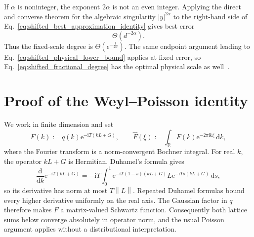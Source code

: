 \documentclass[aps,pra,reprint,floatfix,unsortedaddress,superscriptaddress]{revtex4-2}
\newcommand{\norm}[1]{\left\lVert#1\right\rVert}
\newcommand{\abs}[1]{\left\lvert#1\right\rvert}
\begin{document}
If $\alpha$ is noninteger, the exponent $2\alpha$ is not an even
integer.  Applying the direct and converse theorem for the algebraic
singularity $\abs{y}^{2\alpha}$ to the right-hand side of
Eq.~\eqref{eq:shifted_best_approximation_identity} gives best error
\begin{equation}
    \Theta(d^{-2\alpha}).
    \label{eq:shifted_fractional_best_error}
\end{equation}
Thus the fixed-scale degree is
$\Theta(\epsilon^{-\frac{1}{2\alpha}})$.  The same endpoint
argument leading to Eq.~\eqref{eq:shifted_physical_lower_bound}
applies at fixed error, so
Eq.~\eqref{eq:shifted_fractional_degree} has the optimal physical
scale as well~\cite{devore1993constructive,ditzian1987moduli,
timan1963theory}.

\section{Proof of the Weyl--Poisson identity}
\label{app:weyl_poisson}

We work in finite dimension and set
\begin{equation}
    F(k):=q(k)\mathrm e^{-\mathrm iT(kL+G)},
    \qquad
    \widehat F(\xi):=
    \int_{\mathbb R}F(k)\mathrm e^{-2\pi\mathrm ik\xi}\,\mathrm dk,
    \label{eq:operator_fourier_transform}
\end{equation}
where the Fourier transform is a norm-convergent Bochner integral.  For
real $k$, the operator $kL+G$ is Hermitian.  Duhamel's formula gives
\begin{equation}
\frac{\mathrm d}{\mathrm dk}
\mathrm e^{-\mathrm iT(kL+G)}
=-\mathrm iT\int_0^1
\mathrm e^{-\mathrm iT(1-s)(kL+G)}L
\mathrm e^{-\mathrm iTs(kL+G)}\,\mathrm ds,
\label{eq:weyl_duhamel_derivative}
\end{equation}
so its derivative has norm at most $T\norm{L}$.  Repeated Duhamel
formulas bound every higher derivative uniformly on the real axis.
The Gaussian factor in $q$ therefore makes $F$ a matrix-valued Schwartz
function.  Consequently both lattice sums below converge absolutely in
operator norm, and the usual Poisson argument applies without a
distributional interpretation.
\end{document}
